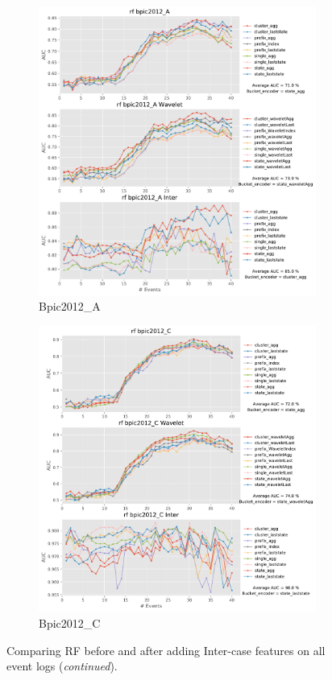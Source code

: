 \begin{figure}[!htbp]
	\medskip
	\begin{subfigure}{0.48\textwidth}
		\includegraphics[width=\linewidth]{images/inter/rf/bpic2012_A.pdf}
		\caption{Bpic2012\_A} \label{fig:b12ai}
	\end{subfigure}\hspace*{\fill}
	\begin{subfigure}{0.48\textwidth}
		\includegraphics[width=\linewidth]{images/inter/rf/bpic2012_C.pdf}
		\caption{Bpic2012\_C} \label{fig:b12ci}
	\end{subfigure}	
\caption{Comparing RF before and after adding Inter-case features on all event logs  (\textit{continued}).}
\label{fig:interr2}
\end{figure}





